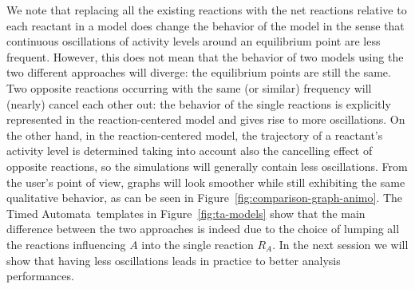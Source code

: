\documentclass{llncs}
\newcommand{\tas}{Timed Automata}
\begin{document}
We note that replacing all the existing reactions with the net reactions relative to each
reactant in a model does change the behavior of the model in the sense that continuous oscillations
of activity levels around an equilibrium point are less frequent. However, this does not mean that the
behavior of two models using the two different approaches will diverge: the equilibrium points
are still the same.
Two opposite reactions occurring with the same (or similar) frequency will (nearly) cancel each other out: the
behavior of the single reactions is explicitly represented in the reaction-centered model and gives rise to more oscillations.
On the other hand, in the reaction-centered model, the trajectory of a reactant's activity level
is determined taking into account also the cancelling effect of opposite reactions, so the simulations
will generally contain less oscillations.
From the user's point of view, graphs will look smoother while still exhibiting the same qualitative behavior,
as can be seen in Figure~\ref{fig:comparison-graph-animo}.
The \tas\ templates in Figure~\ref{fig:ta-models} show that the main difference between the two approaches
is indeed due to the choice of lumping all the reactions influencing $A$ into the single
reaction $R_A$.
In the next session we will show that having less oscillations leads in practice to better analysis performances.
\end{document}
